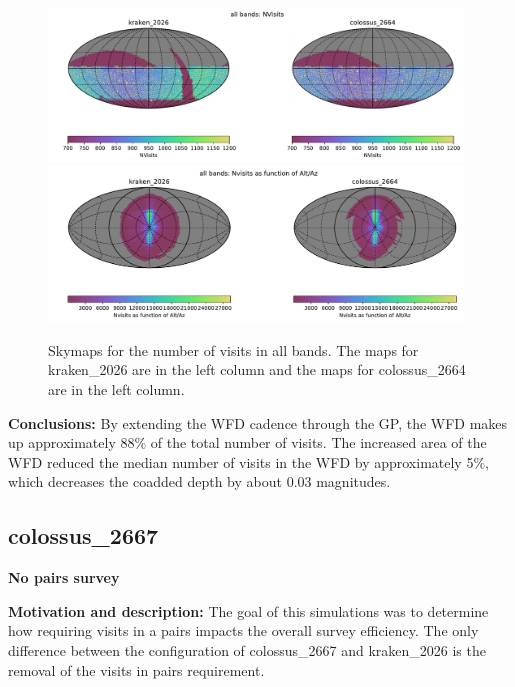 \documentclass[DM,lsstdraft,authoryear,toc]{lsstdoc}
\begin{document}
\begin{figure}[ht]
\centering
\includegraphics[width=0.98\textwidth]{figures/kraken_2026_colossus_2664_NVisits_all_bands_HEAL_ComboSkyMap.pdf}\\
\includegraphics[width=0.98\textwidth]{figures/kraken_2026_colossus_2664_Nvisits_as_function_of_Alt_Az_all_bands_HEAL_ComboSkyMap.pdf}
\caption{Skymaps for the number of visits in all bands. The maps for kraken\_2026 are in the left column and the maps for colossus\_2664 are
in the left column.}
\label{fig:nvisits-2664}
\end{figure}

\textbf{Conclusions:} By extending the WFD cadence through the GP, the WFD makes up approximately 88$\%$ of the total number of visits.
The increased area of the WFD reduced the median number of visits in the WFD by approximately 5$\%$, which decreases the coadded depth
by about 0.03 magnitudes.

\subsection{colossus\_2667} \label{colossus2667}

\textbf{No pairs survey}

\textbf{Motivation and description:} The goal of this simulations was to determine how requiring visits in a pairs
impacts the overall survey efficiency. The only difference between the configuration of colossus\_2667
and kraken\_2026 is the removal of the visits in pairs requirement.
\end{document}
